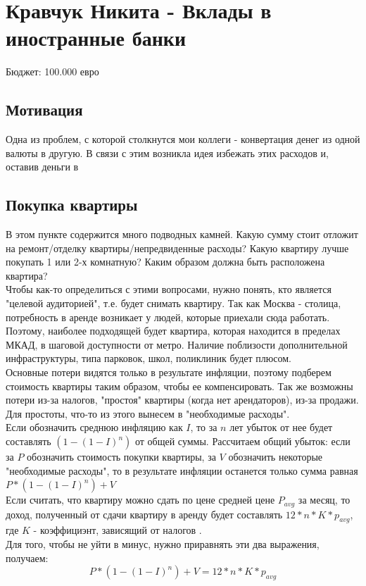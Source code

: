 \section{Кравчук Никита - Вклады в иностранные банки}
Бюджет: 100.000 евро \\

\subsection{Мотивация}
Одна из проблем, с которой столкнутся мои коллеги - конвертация денег из одной валюты в другую. В связи с этим возникла идея избежать этих расходов
и, оставив деньги в 

\subsection{Покупка квартиры}
В этом пункте содержится много подводных камней. Какую сумму стоит отложит на ремонт/отделку квартиры/непредвиденные расходы? Какую квартиру лучше покупать 1 или 2-х комнатную? Каким образом должна быть расположена квартира? \\

Чтобы как-то определиться с этими вопросами, нужно понять, кто является "целевой аудиторией", т.е. будет снимать квартиру. Так как Москва - столица, потребность в аренде возникает у людей, которые приехали сюда работать. Поэтому, наиболее подходящей будет квартира, которая находится в пределах МКАД, в шаговой доступности от метро. Наличие поблизости дополнительной инфраструктуры, типа парковок, школ, поликлиник будет плюсом. \\

Основные потери видятся только в результате инфляции, поэтому подберем стоимость квартиры таким образом, чтобы ее компенсировать. Так же возможны потери из-за налогов, "простоя" квартиры (когда нет арендаторов), из-за продажи. Для простоты, что-то из этого вынесем в "необходимые расходы".\\

Если обозначить среднюю инфляцию как $I$, то за $n$ лет убыток от нее будет составлять $(1-(1-I)^{n})$ от общей суммы. Рассчитаем общий убыток: если за $P$ обозначить стоимость покупки квартиры, за $V$ обозначить некоторые "необходимые расходы", то в результате инфляции останется только сумма равная $P*(1-(1-I)^{n}) + V$ \\
Если считать, что квартиру можно сдать по цене средней цене $P_{avg}$ за месяц, то доход, полученный от сдачи квартиру в аренду будет составлять $12*n*K*p_{avg}$, где $K$ - коэффициэнт, зависящий от налогов .\\ Для того, чтобы не уйти в минус, нужно приравнять эти два выражения, получаем:
\begin{equation}
P*(1-(1-I)^{n}) + V = 12*n*K*p_{avg}
\end{equation}

